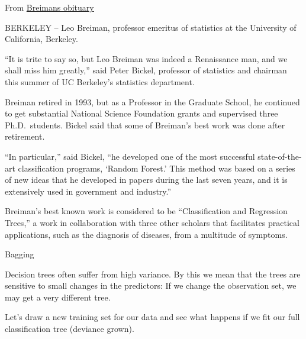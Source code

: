 \documentclass[10pt,ignorenonframetext,]{beamer}
\begin{document}
\begin{frame}

From
\href{https://www.berkeley.edu/news/media/releases/2005/07/07_breiman.shtml}{Breimans
obituary}

BERKELEY -- Leo Breiman, professor emeritus of statistics at the
University of California, Berkeley.

``It is trite to say so, but Leo Breiman was indeed a Renaissance man,
and we shall miss him greatly,'' said Peter Bickel, professor of
statistics and chairman this summer of UC Berkeley's statistics
department.

Breiman retired in 1993, but as a Professor in the Graduate School, he
continued to get substantial National Science Foundation grants and
supervised three Ph.D.~students. Bickel said that some of Breiman's best
work was done after retirement.

\end{frame}

\begin{frame}

``In particular,'' said Bickel, ``he developed one of the most
successful state-of-the-art classification programs, `Random Forest.'
This method was based on a series of new ideas that he developed in
papers during the last seven years, and it is extensively used in
government and industry.''

Breiman's best known work is considered to be ``Classification and
Regression Trees,'' a work in collaboration with three other scholars
that facilitates practical applications, such as the diagnosis of
diseases, from a multitude of symptoms.

\end{frame}

\begin{frame}{Bagging}

Decision trees often suffer from high variance. By this we mean that the
trees are sensitive to small changes in the predictors: If we change the
observation set, we may get a very different tree.

Let's draw a new training set for our data and see what happens if we
fit our full classification tree (deviance grown).

\end{frame}
\end{document}
